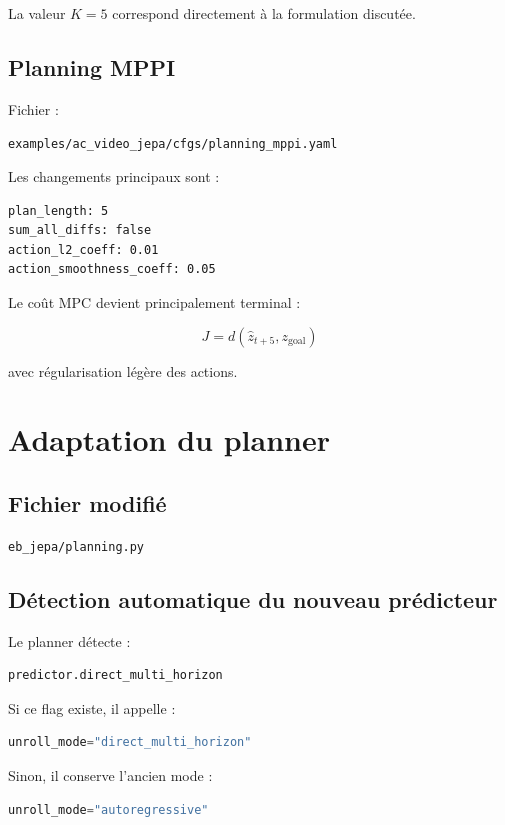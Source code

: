\documentclass[11pt,a4paper]{article}
\newcommand{\filepath}[1]{\texttt{#1}}
\begin{document}
La valeur \(K=5\) correspond directement à la formulation discutée.

\subsection{Planning MPPI}

Fichier :

\filepath{examples/ac\_video\_jepa/cfgs/planning\_mppi.yaml}

Les changements principaux sont :

\begin{lstlisting}
plan_length: 5
sum_all_diffs: false
action_l2_coeff: 0.01
action_smoothness_coeff: 0.05
\end{lstlisting}

Le coût MPC devient principalement terminal :

\[
J = d(\hat z_{t+5}, z_{\text{goal}})
\]

avec régularisation légère des actions.

\section{Adaptation du planner}

\subsection{Fichier modifié}

\filepath{eb\_jepa/planning.py}

\subsection{Détection automatique du nouveau prédicteur}

Le planner détecte :

\begin{lstlisting}[language=Python]
predictor.direct_multi_horizon
\end{lstlisting}

Si ce flag existe, il appelle :

\begin{lstlisting}[language=Python]
unroll_mode="direct_multi_horizon"
\end{lstlisting}

Sinon, il conserve l'ancien mode :

\begin{lstlisting}[language=Python]
unroll_mode="autoregressive"
\end{lstlisting}
\end{document}
